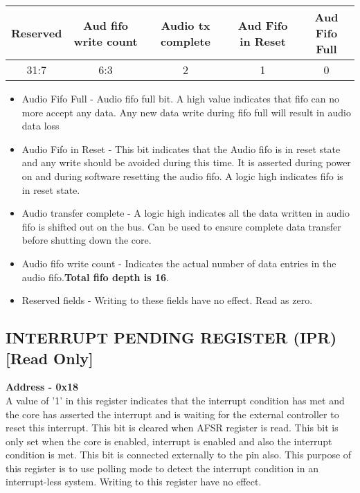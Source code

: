 \documentclass[12pt,a4paper]{report}
\begin{document}
\begin{center}
\begin{tabular}{|c|c|c|c|c| } 
 \hline
 Reserved   & Aud fifo write count & Audio tx complete &  Aud Fifo in Reset &  Aud Fifo Full \\ 
\hline
31:7 & 6:3  &  2 & 1 & 0\\
 \hline
\end{tabular}
\end{center}


\begin{itemize}
\item Audio Fifo Full   -  Audio fifo full bit. A high value indicates that fifo can no more accept any data. Any new data write during fifo full will result in audio data loss
\item Audio Fifo in Reset  -  This bit indicates that the Audio fifo is in reset state and any write should be avoided during this time. It is asserted during power on and during software resetting the audio fifo. A logic high indicates fifo is in reset state.
\item Audio transfer complete - A logic high indicates all the data written in audio fifo is shifted out on the bus. Can be used to ensure complete data transfer before shutting down the core.
\item Audio fifo write count - Indicates the actual number of data entries in the audio fifo.\textbf{Total fifo depth is 16}.
\item Reserved fields - Writing to these fields have no effect. Read as zero.
\end{itemize}

\subsection{INTERRUPT PENDING REGISTER (IPR) [Read Only] }
\hspace{1.6cm}
\textbf{Address - 0x18}
\\
A value of '1' in this register indicates that the interrupt condition has met and the core has asserted the interrupt and is waiting for the external controller to reset this interrupt. This bit is cleared when AFSR register is read.
This bit is only set when the core is enabled, interrupt is enabled and also the interrupt condition is met. This bit is connected externally to the pin also. This purpose of this register is to use polling mode to detect the interrupt condition in an interrupt-less system. Writing to this register have no effect.
\end{document}
